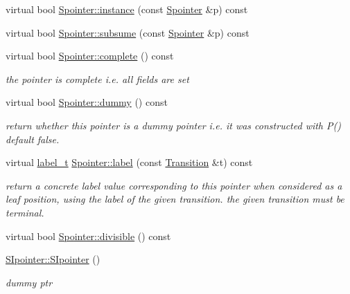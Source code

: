 \begin{DoxyCompactItemize}
virtual bool \mbox{\hyperlink{group__table_ga718cc6f7473c3fb1b074211bf2f16d8b}{Spointer\+::instance}} (const \mbox{\hyperlink{classSpointer}{Spointer}} \&p) const
\item 
virtual bool \mbox{\hyperlink{group__table_ga06fa67855bfb50d81e18bdfacce965ce}{Spointer\+::subsume}} (const \mbox{\hyperlink{classSpointer}{Spointer}} \&p) const
\item 
\mbox{\label{group__table_gace5bd2026fef480084f3cc5dc28086f3}} 
virtual bool \mbox{\hyperlink{group__table_gace5bd2026fef480084f3cc5dc28086f3}{Spointer\+::complete}} () const
\begin{DoxyCompactList}\small\item\em the pointer is complete i.\+e. all fields are set \end{DoxyCompactList}\item 
\mbox{\label{group__table_ga0a994ec6827ef23556b500382fc5a1fc}} 
virtual bool \mbox{\hyperlink{group__table_ga0a994ec6827ef23556b500382fc5a1fc}{Spointer\+::dummy}} () const
\begin{DoxyCompactList}\small\item\em return whether this pointer is a dummy pointer i.\+e. it was constructed with P() default false. \end{DoxyCompactList}\item 
\mbox{\label{group__table_ga15067ad809b5ac25b45c0187550e0b17}} 
virtual \mbox{\hyperlink{group__output_ga22fde970e635fcf63962743b2d5c441d}{label\+\_\+t}} \mbox{\hyperlink{group__table_ga15067ad809b5ac25b45c0187550e0b17}{Spointer\+::label}} (const \mbox{\hyperlink{classTransition}{Transition}} \&t) const
\begin{DoxyCompactList}\small\item\em return a concrete label value corresponding to this pointer when considered as a leaf position, using the label of the given transition. the given transition must be terminal. \end{DoxyCompactList}\item 
virtual bool \mbox{\hyperlink{group__table_ga54817fbae1688dab4dfff5724e762640}{Spointer\+::divisible}} () const
\item 
\mbox{\hyperlink{group__table_ga7e962d8567566398e5f620ef964267cd}{S\+Ipointer\+::\+S\+Ipointer}} ()
\begin{DoxyCompactList}\small\item\em dummy ptr \end{DoxyCompactList}\item 

\end{DoxyCompactItemize}
